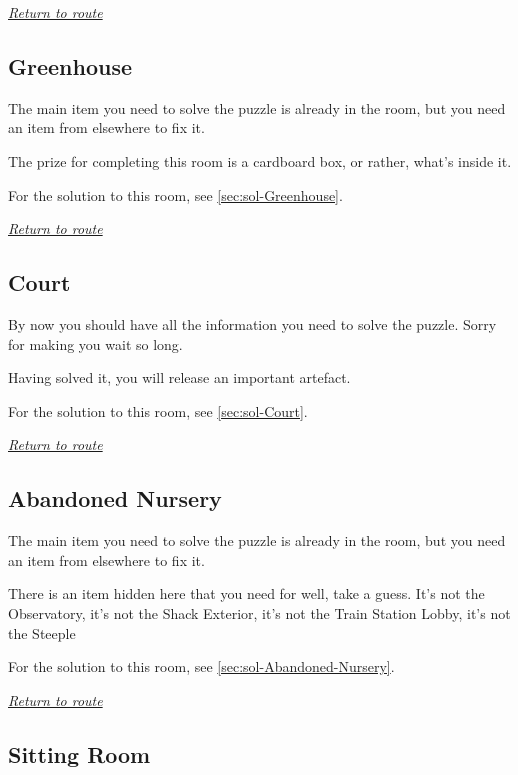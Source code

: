 \documentclass[a5paper]{extarticle}
\begin{document}
\hyperref[sec:route-12]{\emph{Return to route}}

\newpage
\subsection{Greenhouse}\label{sec:req-Greenhouse}

The main item you need to solve the puzzle is already in the room,
but you need an item from elsewhere to fix it.

The prize for completing this room is a cardboard box, or rather,
what's inside it.

For the solution to this room, see \cref{sec:sol-Greenhouse}.

\hyperref[sec:route-13]{\emph{Return to route}}

\newpage
\subsection{Court}\label{sec:req-Court}

By now you should have all the information you need to solve the puzzle.
Sorry for making you wait so long.

Having solved it, you will release an important artefact.

For the solution to this room, see \cref{sec:sol-Court}.

\hyperref[sec:route-13]{\emph{Return to route}}

\newpage
\subsection{Abandoned Nursery}\label{sec:req-Abandoned-Nursery}

The main item you need to solve the puzzle is already in the room,
but you need an item from elsewhere to fix it.

There is an item hidden here that you need for\xelip
well, take a guess. It's not the Observatory, it's not the Shack Exterior,
it's not the Train Station Lobby, it's not the Steeple\xelip

For the solution to this room, see \cref{sec:sol-Abandoned-Nursery}.

\hyperref[sec:route-13]{\emph{Return to route}}

\newpage
\subsection{Sitting Room}\label{sec:req-Sitting-Room}
\end{document}
